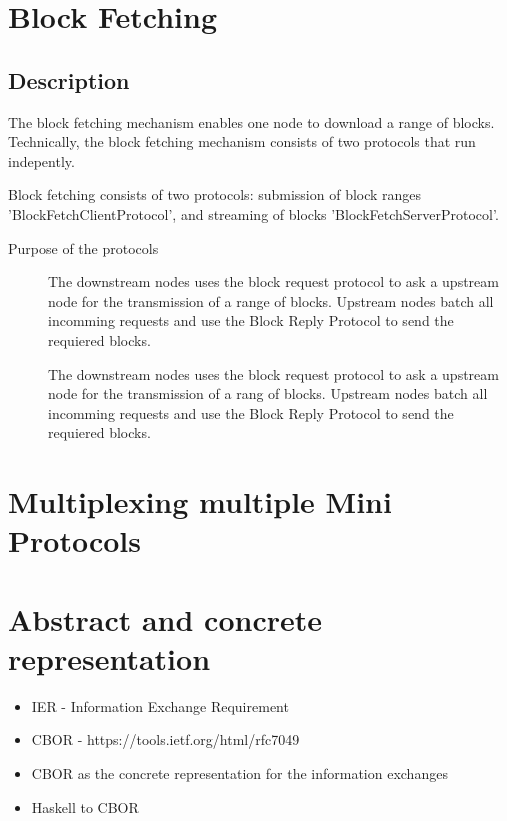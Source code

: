 \documentclass{report}
\newcommand{\hsref}[1]{} %
\theoremstyle{definition}{
  \newtheorem{lemma}{Lemma}[section] %
  \newtheorem{definition}[lemma]{Definition}
}
\theoremstyle{theorem}{
  \newtheorem{invariant}[lemma]{Invariant}
  \newtheorem{proofobligation}[lemma]{Proof Obligation}
}
\numberwithin{equation}{lemma}
\begin{document}
\section{Block Fetching}
\hsref{ouroboros-network/ouroboros-network/src/Ouroboros/Network/Protocol/BlockFetch/Type.hs}
\subsection{Description}
The block fetching mechanism enables one node to download a range of blocks.
Technically, the block fetching mechanism consists of two protocols that run
indepently.

Block fetching consists of two protocols: submission of block ranges 'BlockFetchClientProtocol', and
 streaming of blocks 'BlockFetchServerProtocol'.

\begin{description}
\item[Purpose of the protocols]
  The downstream nodes uses the block request protocol to ask a upstream node
  for the transmission of a range of blocks.
  Upstream nodes batch all incomming requests and use the Block Reply Protocol to
  send the requiered blocks.
\item[]
  The downstream nodes uses the block request protocol to ask a upstream node
  for the transmission of a rang of blocks.
  Upstream nodes batch all incomming requests and use the Block Reply Protocol to
  send the requiered blocks.
\end{description}

\section{Multiplexing multiple Mini Protocols}
\section{Abstract and concrete representation}
\label{CBOR-section}
\begin{itemize}
  \item IER - Information Exchange Requirement
  \item CBOR - https://tools.ietf.org/html/rfc7049
\end{itemize}

\begin{itemize}
  \item CBOR as the concrete representation for the information exchanges
  \item Haskell to CBOR 
\end{itemize}
\end{document}
